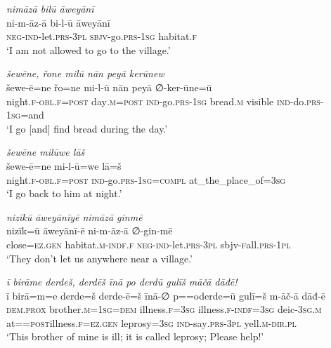 \ea \label{DG.39}
\textit{nimāzā bilū āweyānī} \\ 
\gll ni-m-āz-ā bi-l-ū āweyānī \\ 
 \textsc{neg-}\textsc{ind-}let\textsc{.prs}\textsc{-3pl} \textsc{sbjv-}go\textsc{.prs}\textsc{-1sg} habitat\textsc{\textsc{.f}} \\ 
\glt `I am not allowed to go to the village.'
\z 
 
\ea \label{DG.40}
\textit{šewēne, řone milū nān peyā kerūnew} \\ 
\gll šewe-ē=ne řo=ne mi-l-ū nān peyā ∅-ker-ūne=ū \\ 
 night\textsc{\textsc{.f}}\textsc{-obl}\textsc{\textsc{.f}}\textsc{=\textsc{post}} day\textsc{.m}\textsc{=\textsc{post}} \textsc{ind-}go\textsc{.prs}\textsc{-1sg} bread\textsc{.m} visible \textsc{ind-}do\textsc{.prs}\textsc{-1sg}=and \\ 
\glt `I go [and] find bread during the day.'
\z 
 
\ea \label{DG.41}
\textit{šewēne milūwe lāš} \\ 
\gll šewe-ē=ne mi-l-ū=we lā=š \\ 
 night\textsc{\textsc{.f}}\textsc{-obl}\textsc{\textsc{.f}}\textsc{=\textsc{post}} \textsc{ind-}go\textsc{.prs}\textsc{-1sg}\textsc{=compl} at\_the\_place\_of\textsc{=3sg} \\ 
\glt `I go back to him at night.'
\z 
 
\ea \label{DG.42}
\textit{nizīkū āweyānīyē nimāzā ginmē} \\ 
\gll nizīk=ū āweyānī-ē ni-m-āz-ā ∅-gin-mē \\ 
 close\textsc{=ez}\textsc{.gen} habitat\textsc{\textsc{.m}}\textsc{-indf}\textsc{\textsc{.f}} \textsc{neg-}\textsc{ind-}let\textsc{.prs}\textsc{-3pl} sbjv\textsc{-f}all\textsc{.prs}\textsc{-1pl} \\ 
\glt `They don’t let us anywhere near a village.'
\z 
 
\ea \label{DG.43}
\textit{ī birāme derdeš, derdēš īnā po derdū gulīš māčā dāđē!} \\ 
\gll ī birā=m=e derde=š derde-ē=š īnā-∅ p==oderde=ū gulī=š m-āč-ā dāđ-ē \\ 
 \textsc{dem.prox} brother\textsc{.m}\textsc{=1sg}\textsc{=dem} illness\textsc{\textsc{.f}}\textsc{=3sg} illness\textsc{\textsc{.f}}\textsc{-indf}\textsc{=3sg} deic\textsc{-3sg}\textsc{.m} at=\textsc{=\textsc{post}}illness\textsc{\textsc{.f}}\textsc{=ez}\textsc{.gen} leprosy\textsc{=3sg} \textsc{ind-}say\textsc{.prs}\textsc{-3pl} yell\textsc{.m}\textsc{-dir}\textsc{.pl} \\ 
\glt `This brother of mine is ill; it is called leprosy; Please help!'
\z 
 
